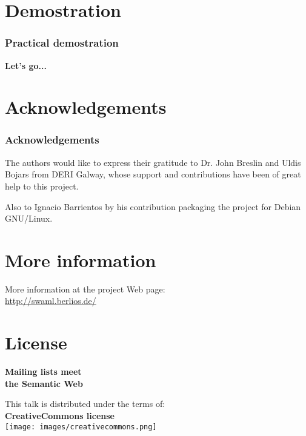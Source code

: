 \documentclass[spanish,notes=hide,16pt]{beamer}
\begin{document}
\section{Demostration}
\frame
{
  \frametitle{Practical demostration}

  \begin{center}
    \LARGE{\textbf{Let's go...}}
  \end{center}
}

\appendix

\section{Acknowledgements}
\frame
{
  \frametitle{Acknowledgements}
  
  \begin{Large}
    The authors would like to express their gratitude to Dr. John Breslin and 
    Uldis Bojars from DERI Galway, whose support and contributions have been 
    of great help to this project. 
  \end{Large}

  \vspace{1cm}

  \begin{Large}
    Also to Ignacio Barrientos by his contribution packaging the project for 
    Debian GNU/Linux.
  \end{Large}
}

\section{More information}
\frame
{
  \begin{center}
    More information at the project Web page:\\
    \vspace{1cm}
    \LARGE{\href{http://swaml.berlios.de/}{http://swaml.berlios.de/}}\\
  \end{center}

}

\section{License}
\frame
{
  \begin{center}
    \LARGE{\textbf{Mailing lists meet\\the Semantic Web}}\\
    \vspace{1cm}
    \vspace{1cm}
    \begin{tiny}
	This talk is distributed under the terms of:\\
	\textbf{CreativeCommons license}\\
	\texttt{[image: images/creativecommons.png]}
    \end{tiny}
  \end{center}
}
\end{document}

